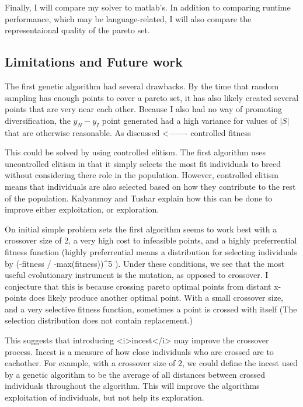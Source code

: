 \documentclass{article}
\begin{document}
{{Finally, I will compare my solver to matlab's.
In addition to comparing runtime performance, which may be language-related, I will also compare the representaional quality of the pareto set.


\subsection{Limitations and Future work}
The first genetic algorithm had several drawbacks.
By the time that random sampling has enough points to cover a pareto set, it has also likely created several points that are very near each other.
Because I also had no way of promoting diversification, the $y_N - y_I$ point generated had a high variance for values of $|S|$ that are otherwise reasonable.
As discussed <-------
controlled fitness 

This could be solved by using controlled elitism.
The first algorithm uses uncontrolled elitism in that it simply selects the most fit individuals to breed without considering there role in the population.
However, controlled elitism means that individuals are also selected based on how they contribute to the rest of the population.
Kalyanmoy and Tushar explain how this can be done to improve either exploitation, or exploration.

On initial simple problem sets the first algorithm seems to work best with a crossover size of 2, a very high cost to infeasible points, and a highly preferrential fitness function
(highly preferrential means a distribution for selecting individuals by (-fitness / -max(fitness))^5  ).
Under these conditions, we see that the most useful evolutionary instrument is the mutation, as opposed to crossover.
I conjecture that this is because crossing pareto optimal points from distant x-points does likely produce another optimal point.
With a small crossover size, and a very selective fitness function, sometimes a point is crossed with itself (The selection distribution does not contain replacement.)

This suggests that introducing <i>incest</i> may improve the crossover process.
Incest is a measure of how close individuals who are crossed are to eachother.
For example, with a crossover size of $2$, we could define the incest used by a genetic algorithm to be 
the average of all distances between crossed individuals throughout the algorithm.
This will improve the algorithms exploitation of individuals, but not help its exploration.

}}
\end{document}
